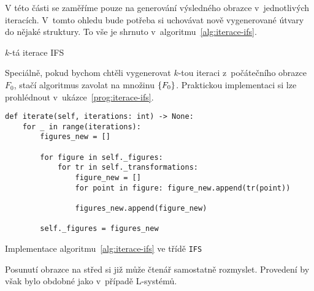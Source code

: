 V této části se zaměříme pouze na generování výsledného obrazce v~jednotlivých iteracích. V~tomto ohledu bude potřeba si uchovávat nově vygenerované útvary do nějaké struktury. To vše je shrnuto v~algoritmu~\ref{alg:iterace-ifs}.
\begin{algorithm}[h]
    \;
    \caption{$k$-tá iterace IFS}
    \label{alg:iterace-ifs}
\end{algorithm}
Speciálně, pokud bychom chtěli vygenerovat $k$-tou iteraci z~počátečního obrazce $F_0$, stačí algoritmus zavolat na množinu $\left\{F_0\right\}$. Praktickou implementaci si lze prohlédnout v~ukázce~\ref{prog:iterace-ifs}.
\begin{program}[h]
\begin{lstlisting}[style=python]
def iterate(self, iterations: int) -> None:
    for _ in range(iterations):
        figures_new = []
        
        for figure in self._figures:
            for tr in self._transformations:
                figure_new = []
                for point in figure: figure_new.append(tr(point))

                figures_new.append(figure_new)
    
        self._figures = figures_new
\end{lstlisting}
    \caption{Implementace algoritmu~\ref{alg:iterace-ifs} ve třídě \texttt{IFS}}
    \label{prog:iterace-ifs}
\end{program}
Posunutí obrazce na střed si již může čtenář samostatně rozmyslet. Provedení by však bylo obdobné jako v~případě L-systémů.